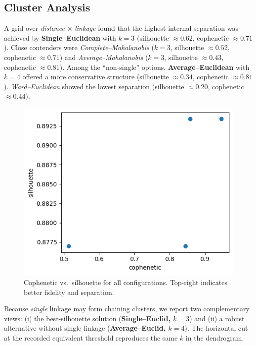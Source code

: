 \documentclass[journal]{IEEEtran}
\begin{document}
\subsection{Cluster Analysis}

A grid over \emph{distance} $\times$ \emph{linkage} found that the highest internal separation was achieved by
\textbf{Single–Euclidean} with \textbf{$k=3$} (silhouette $\approx 0.62$, cophenetic $\approx 0.71$). Close contenders were
\emph{Complete–Mahalanobis} ($k=3$, silhouette $\approx 0.52$, cophenetic $\approx 0.71$) and
\emph{Average–Mahalanobis} ($k=3$, silhouette $\approx 0.43$, cophenetic $\approx 0.81$).
Among the “non-single” options, \textbf{Average–Euclidean} with \textbf{$k=4$} offered a more conservative structure
(silhouette $\approx 0.34$, cophenetic $\approx 0.81$). \emph{Ward–Euclidean} showed the lowest separation
(silhouette $\approx 0.20$, cophenetic $\approx 0.44$).

\begin{figure}[H]
	\centering
	\includegraphics[width=0.8\columnwidth]{assets/1_coph_vs_silhouette.png}
	\caption{Cophenetic vs.\ silhouette for all configurations. Top-right indicates better fidelity and separation.}
	\label{fig:coph_vs_silhouette}
\end{figure}

Because \emph{single} linkage may form chaining clusters, we report two complementary views:
(i) the best-silhouette solution (\textbf{Single–Euclid, $k=3$}) and (ii) a robust alternative without single linkage
(\textbf{Average–Euclid, $k=4$}). The horizontal cut at the recorded equivalent threshold reproduces the same $k$ in the
dendrogram.
\end{document}
